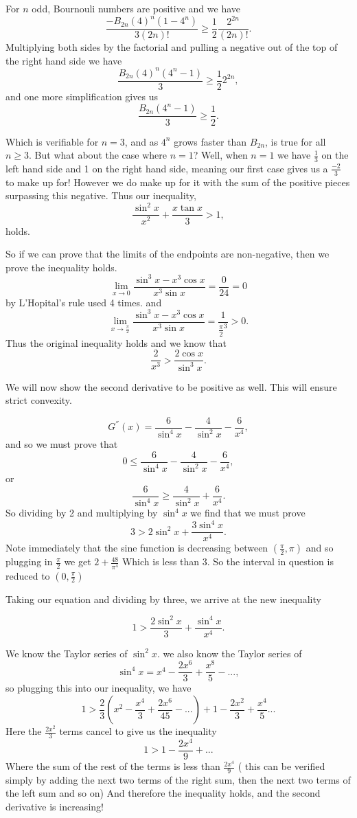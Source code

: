 \documentclass[12pt]{report}
\numberwithin{definition}{section}
\begin{document}
 
 For $n$ odd, Bournouli numbers are positive and we have 
 \[
 \frac{-B_{2n}(4)^n(1-4^n)}{3(2n)!} \geq \frac{1}{2} \frac{2^{2n}}{(2n)!}.
 \]
 Multiplying both sides by the factorial and pulling a negative out of the top of the right hand side we have 
 \[
 \frac{B_{2n}(4)^n(4^n-1)}{3} \geq \frac{1}{2}2^{2n},
 \]
 and one more simplification gives us 
 \[
 \frac{B_{2n}(4^n-1)}{3} \geq \frac{1}{2}.
 \]
  
 Which is verifiable for $n=3$, and as $4^n$ grows faster than $B_{2n}$, is true for all $n\geq3$. But what about the case where $n = 1$? Well, when $n = 1$ we have $\frac{1}{3}$ on the left hand side and 1 on the right hand side, meaning our first case gives us a $\frac{-2}{3}$ to make up for! However we do make up for it with the sum of the positive pieces surpassing this negative. 
 Thus our inequality,
  \[\frac{\sin^2{x}}{x^2}+\frac{x \tan{x}}{3}>1,\]
  holds. 
 

  
  So if we can prove that the limits of the endpoints are non-negative, then we prove the inequality holds. 
 \[ \lim_{x \to 0} \frac{\sin^3{x}-x^3\cos{x}}{x^3\sin{x}} = \frac{0}{24} = 0 \]
 by L'Hopital's rule used 4 times. 
 and 
  \[ \lim_{x \to \frac{\pi}{2}} \frac{\sin^3{x}-x^3\cos{x}}{x^3\sin{x}} = \frac{1}{\frac{\pi}{2}^3}>0. \]
 Thus the original inequality holds and we know that 
  \[\frac{2}{x^3} >\frac{2 \cos {x}}{\sin^3{x}} .\]

   We will now show the second derivative to be positive as well. This will ensure strict convexity. 
   
 \[G^{''}(x) = \frac{6}{\sin^4{x}}-\frac{4}{\sin^2{x}}-\frac{6}{x^4}  ,         \]
 and so we must prove that 
  \[0 \leq \frac{6}{\sin^4{x}}-\frac{4}{\sin^2{x}}-\frac{6}{x^4} ,         \]
  or 
  \[\frac{6}{\sin^4{x}} \geq \frac{4}{\sin^2{x}}+\frac{6}{x^4}  .         \]
 So dividing by 2 and multiplying by $\sin^4{x}$ we find that we must prove 
 \[3>2\sin^2{x}+\frac{3\sin^4{x}}{x^4}. \]
 Note immediately that the sine function is decreasing between $(\frac{\pi}{2}, \pi)$ and so plugging in $\frac{\pi}{2}$ we get $2+\frac{48}{\pi^4}$ Which is less than 3. So the interval in question is reduced to $(0, \frac{\pi}{2})$ 
 
 Taking our equation and dividing by three, we arrive at the new inequality 

\[1>\frac{2\sin^2{x}}{3}+\frac{\sin^4{x}}{x^4}.\]

  We know the Taylor series of $\sin^2{x}$. we also know the Taylor series of 
 \[\sin^4{x} = x^4-\frac{2x^6}{3}+\frac{x^8}{5}-...,\]
 so plugging this into our inequality, we have 
 \[1>\frac{2}{3}(x^2- \frac{x^4}{3}+\frac{2x^6}{45}-...)+1-\frac{2x^2}{3}+\frac{x^4}{5}...\]
 Here the $\frac{2x^2}{3}$ terms cancel to give us the inequality 
 \[1>1-\frac{2x^4}{9}+...\]
 Where the sum of the rest of the terms is less than $\frac{2x^4}{9}$ ( this can be verified simply by adding the next two terms of the right sum, then the next two terms of the left sum and so on)
 	And therefore the inequality holds, and the second derivative is increasing! 
 	
\end{document}
